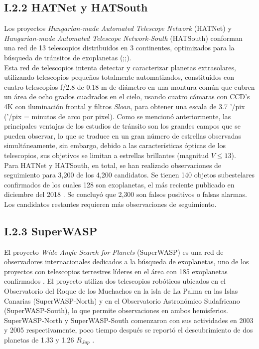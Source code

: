 \subsection*{I.2.2 HATNet y HATSouth}

Los proyectos \textit{Hungarian-made Automated Telescope Network} (HATNet) y \textit{Hungarian-made Automated Telescope Network-South} (HATSouth) conforman una red de 13 telescopios distribuidos en 3 continentes, optimizados para la búsqueda de tránsitos de exoplanetas (\citep{bakos2002system};\cite{bakos2004wide};\cite{bakos2013hatsouth}).\\

Esta red de telescopios intenta detectar y caracterizar planetas extrasolares, utilizando telescopios pequeños totalmente automatizados, constituidos con cuatro telescopios f/2.8 de 0.18 m de diámetro en una montura común que cubren un área de ocho grados cuadrados en el cielo, usando cuatro cámaras con CCD's 4K con iluminación frontal y filtros \textit{Sloan}, para obtener una escala de 3.7 '/pix ('/pix = minutos de arco por pixel). Como se mencionó anteriormente, las principales ventajas de los estudios de tránsito son los grandes campos que se pueden observar, lo que se traduce en un gran número de estrellas observadas simultáneamente, sin embargo, debido a las características ópticas de los telescopios, sus objetivos se limitan a estrellas brillantes (magnitud $V \leq 13$).\\

Para HATNet y HATSouth, en total, se han realizado observaciones de seguimiento para 3,200 de los 4,200 candidatos. Se tienen 140 objetos subestelares confirmados de los cuales 128 son exoplanetas, el más reciente publicado en diciembre del 2018 \cite{bakos2018hats}. Se concluyó que 2,300 son falsos positivos o falsas alarmas. Los candidatos restantes requieren más observaciones de seguimiento.\\

\subsection*{I.2.3 SuperWASP}

El proyecto \textit{Wide Angle Search for Planets} (SuperWASP) es una red de observadores internacionales dedicados a la búsqueda de exoplanetas, uno de los proyectos con telescopios terrestres líderes en el área con 185 exoplanetas confirmados \citep{pollacco2006wasp}. El proyecto utiliza dos telescopios robóticos ubicados en el Observatorio del Roque de los Muchachos en la isla de La Palma en las Islas Canarias (SuperWASP-North) y en el Observatorio Astronómico Sudafricano (SuperWASP-South), lo que permite observaciones en ambos hemisferios. SuperWASP-North y SuperWASP-South comenzaron con sus actividades en 2003 y 2005 respectivamente, poco tiempo después se reportó el descubrimiento de dos planetas de 1.33 y 1.26 $R_{Jup}$ \citep{cameron2007wasp}.\\


